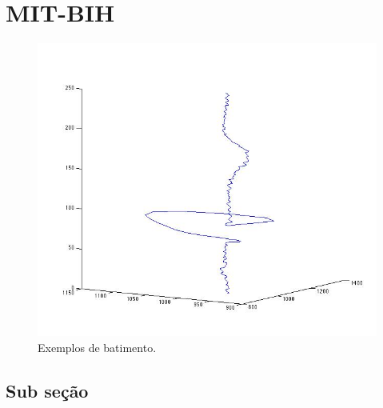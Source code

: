 \section{MIT-BIH}

\begin{figure}[htb]
	\begin{center}	
		\includegraphics[scale=0.6]{imagens/vcg_3d_1hb.jpg}
	\end{center}
	\caption{Exemplos de batimento. }
	\label{fig_mitbih}
\end{figure}

\subsection{Sub seção}

